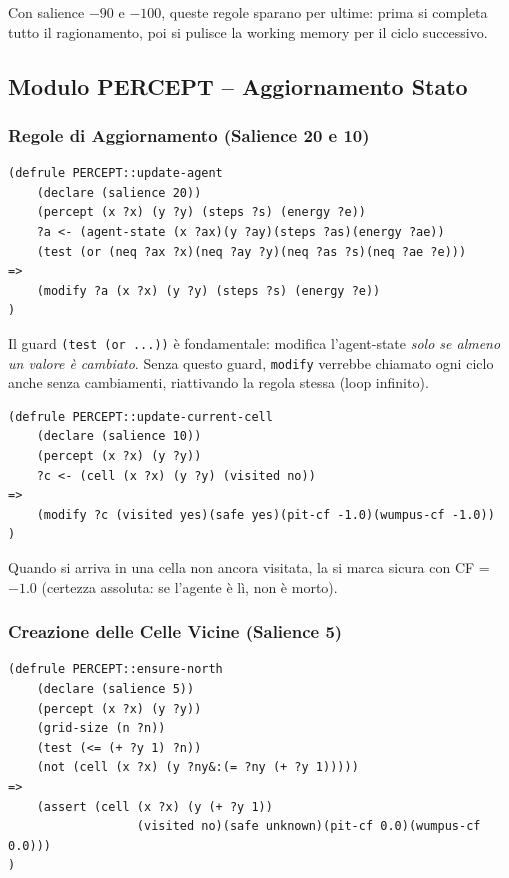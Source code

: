 \documentclass[12pt,a4paper]{article}
\begin{document}
Con salience $-90$ e $-100$, queste regole sparano per ultime: prima si completa
tutto il ragionamento, poi si pulisce la working memory per il ciclo successivo.

\subsection{Modulo PERCEPT -- Aggiornamento Stato}

\subsubsection{Regole di Aggiornamento (Salience 20 e 10)}

\begin{lstlisting}
(defrule PERCEPT::update-agent
    (declare (salience 20))
    (percept (x ?x) (y ?y) (steps ?s) (energy ?e))
    ?a <- (agent-state (x ?ax)(y ?ay)(steps ?as)(energy ?ae))
    (test (or (neq ?ax ?x)(neq ?ay ?y)(neq ?as ?s)(neq ?ae ?e)))
=>
    (modify ?a (x ?x) (y ?y) (steps ?s) (energy ?e))
)
\end{lstlisting}

Il guard \texttt{(test (or ...))} è fondamentale: modifica l'agent-state
\emph{solo se almeno un valore è cambiato}. Senza questo guard, \texttt{modify}
verrebbe chiamato ogni ciclo anche senza cambiamenti, riattivando la regola
stessa (loop infinito).

\begin{lstlisting}
(defrule PERCEPT::update-current-cell
    (declare (salience 10))
    (percept (x ?x) (y ?y))
    ?c <- (cell (x ?x) (y ?y) (visited no))
=>
    (modify ?c (visited yes)(safe yes)(pit-cf -1.0)(wumpus-cf -1.0))
)
\end{lstlisting}

Quando si arriva in una cella non ancora visitata, la si marca sicura
con CF = $-1.0$ (certezza assoluta: se l'agente è lì, non è morto).

\subsubsection{Creazione delle Celle Vicine (Salience 5)}

\begin{lstlisting}
(defrule PERCEPT::ensure-north
    (declare (salience 5))
    (percept (x ?x) (y ?y))
    (grid-size (n ?n))
    (test (<= (+ ?y 1) ?n))
    (not (cell (x ?x) (y ?ny&:(= ?ny (+ ?y 1)))))
=>
    (assert (cell (x ?x) (y (+ ?y 1))
                  (visited no)(safe unknown)(pit-cf 0.0)(wumpus-cf 0.0)))
)
\end{lstlisting}
\end{document}
